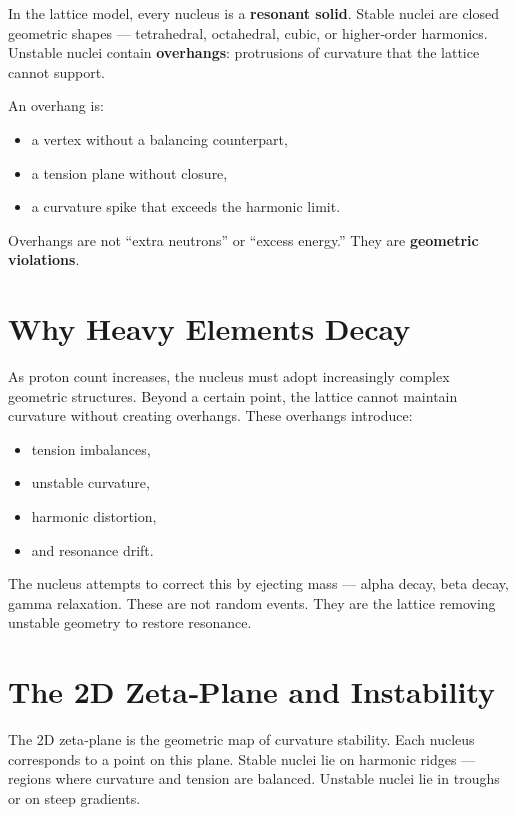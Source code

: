 \documentclass[11pt, letterpaper, openany]{book}
\begin{document}
In the lattice model, every nucleus is a \textbf{resonant solid}. Stable nuclei are closed
geometric shapes — tetrahedral, octahedral, cubic, or higher‑order harmonics. Unstable
nuclei contain \textbf{overhangs}: protrusions of curvature that the lattice cannot support.

An overhang is:

\begin{itemize}
    \item a vertex without a balancing counterpart,
    \item a tension plane without closure,
    \item a curvature spike that exceeds the harmonic limit.
\end{itemize}

Overhangs are not “extra neutrons” or “excess energy.”  
They are \textbf{geometric violations}.

\section{Why Heavy Elements Decay}

As proton count increases, the nucleus must adopt increasingly complex geometric
structures. Beyond a certain point, the lattice cannot maintain curvature without creating
overhangs. These overhangs introduce:

\begin{itemize}
    \item tension imbalances,
    \item unstable curvature,
    \item harmonic distortion,
    \item and resonance drift.
\end{itemize}

The nucleus attempts to correct this by ejecting mass — alpha decay, beta decay, gamma
relaxation. These are not random events. They are the lattice removing unstable geometry
to restore resonance.

\section{The 2D Zeta‑Plane and Instability}

The 2D zeta‑plane is the geometric map of curvature stability. Each nucleus corresponds
to a point on this plane. Stable nuclei lie on harmonic ridges — regions where curvature
and tension are balanced. Unstable nuclei lie in troughs or on steep gradients.
\end{document}
